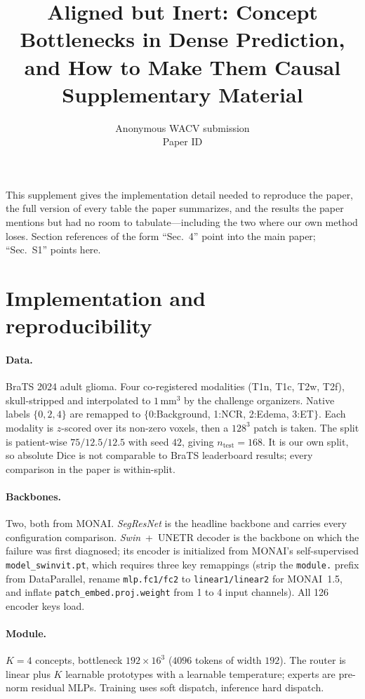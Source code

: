 \documentclass[10pt,twocolumn,letterpaper]{article}
\title{Aligned but Inert: Concept Bottlenecks in Dense Prediction,\\
       and How to Make Them Causal\\[4pt]
       \large Supplementary Material}
\author{Anonymous WACV submission\\
Paper ID \wacvPaperID\\
}
\begin{document}
\maketitle

\noindent
This supplement gives the implementation detail needed to reproduce the paper, the full
version of every table the paper summarizes, and the results the paper mentions but had no
room to tabulate---including the two where our own method loses. Section references of the
form ``Sec.~4'' point into the main paper; ``Sec.~S1'' points here.

\section{Implementation and reproducibility}
\label{sec:impl}

\paragraph{Data.}
BraTS 2024 adult glioma. Four co-registered modalities (T1n, T1c, T2w, T2f), skull-stripped
and interpolated to $1\,\mathrm{mm}^3$ by the challenge organizers. Native labels
$\{0,2,4\}$ are remapped to $\{$0:Background, 1:NCR, 2:Edema, 3:ET$\}$. Each modality is
$z$-scored over its non-zero voxels, then a $128^3$ patch is taken. The split is
patient-wise $75/12.5/12.5$ with seed $42$, giving $n_{\mathrm{test}}{=}168$. It is our own
split, so absolute Dice is not comparable to BraTS leaderboard results; every comparison in
the paper is within-split.

\paragraph{Backbones.}
Two, both from MONAI. \emph{SegResNet} is the headline backbone and carries every
configuration comparison. \emph{Swin}~+~UNETR decoder is the backbone on which the failure
was first diagnosed; its encoder is initialized from MONAI's self-supervised
\texttt{model\_swinvit.pt}, which requires three key remappings (strip the \texttt{module.}
prefix from DataParallel, rename \texttt{mlp.fc1/fc2} to \texttt{linear1/linear2} for
MONAI~1.5, and inflate \texttt{patch\_embed.proj.weight} from 1 to 4 input channels). All
126 encoder keys load.

\paragraph{Module.}
$K{=}4$ concepts, bottleneck $192\times16^3$ ($4096$ tokens of width $192$). The router is
linear plus $K$ learnable prototypes with a learnable temperature; experts are pre-norm
residual MLPs. Training uses soft dispatch, inference hard dispatch.
\end{document}
